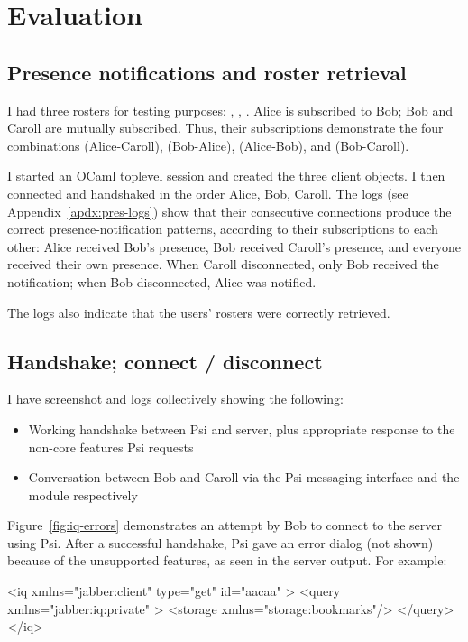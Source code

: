 \chapter{Evaluation}
\section{Presence notifications and roster retrieval}
I had three rosters for testing purposes: , , . Alice is subscribed to Bob; Bob and Caroll are mutually subscribed. Thus, their subscriptions demonstrate the four combinations  (Alice-Caroll),  (Bob-Alice),  (Alice-Bob), and  (Bob-Caroll).

I started an OCaml toplevel session and created the three client objects. I then connected and handshaked in the order Alice, Bob, Caroll.
The logs (see Appendix~\ref{apdx:pres-logs}) show that their consecutive connections produce the correct presence-notification patterns, according to their subscriptions to each other: Alice received Bob's presence, Bob received Caroll's presence, and everyone received their own presence. When Caroll disconnected, only Bob received the notification; when Bob disconnected, Alice was notified.

The logs also indicate that the users' rosters were correctly retrieved.

\section{Handshake; connect / disconnect}
I have screenshot and logs collectively showing the following:
\begin{itemize}
  \item Working handshake between Psi and server, plus appropriate  response to the non-core features Psi requests
  \item Conversation between Bob and Caroll via the Psi messaging interface and the  module respectively
\end{itemize}
Figure~\ref{fig:iq-errors} demonstrates an attempt by Bob to connect to the server using Psi. After a successful handshake, Psi gave an error dialog (not shown) because of the unsupported features, as seen in the server output. For example:

\begin{xml}
<iq xmlns="jabber:client" type="get" id="aacaa" >
  <query xmlns="jabber:iq:private" >
   <storage xmlns="storage:bookmarks"/>
  </query>
</iq>
\end{xml}

